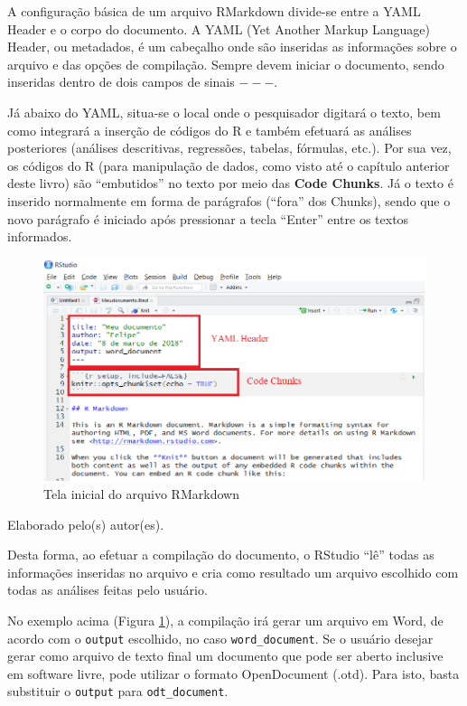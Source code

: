 \documentclass[12pt,portuguese,oneside]{book}
\begin{document}
A configuração básica de um arquivo RMarkdown divide-se entre a YAML
Header e o corpo do documento. A YAML (Yet Another Markup Language)
Header, ou metadados, é um cabeçalho onde são inseridas as informações
sobre o arquivo e das opções de compilação. Sempre devem iniciar o
documento, sendo inseridas dentro de dois campos de sinais \(---\).

Já abaixo do YAML, situa-se o local onde o pesquisador digitará o texto,
bem como integrará a inserção de códigos do R e também efetuará as
análises posteriores (análises descritivas, regressões, tabelas,
fórmulas, etc.). Por sua vez, os códigos do R (para manipulação de
dados, como visto até o capítulo anterior deste livro) são ``embutidos''
no texto por meio das \textbf{Code Chunks}. Já o texto é inserido
normalmente em forma de parágrafos (``fora'' dos Chunks), sendo que o
novo parágrafo é iniciado após pressionar a tecla ``Enter'' entre os
textos informados.

\begin{figure}[H]

{\centering \includegraphics[width=0.8\linewidth]{rmark2} 

}

\caption{Tela inicial do arquivo RMarkdown}\label{fig:rmark2}
\end{figure}

Elaborado pelo(s) autor(es).

Desta forma, ao efetuar a compilação do documento, o RStudio ``lê''
todas as informações inseridas no arquivo e cria como resultado um
arquivo escolhido com todas as análises feitas pelo usuário.

No exemplo acima (Figura \ref{fig:rmark2}), a compilação irá gerar um
arquivo em Word, de acordo com o \texttt{output} escolhido, no caso
\texttt{word\_document}. Se o usuário desejar gerar como arquivo de
texto final um documento que pode ser aberto inclusive em software
livre, pode utilizar o formato OpenDocument (.otd). Para isto, basta
substituir o \texttt{output} para \texttt{odt\_document}.
\end{document}
